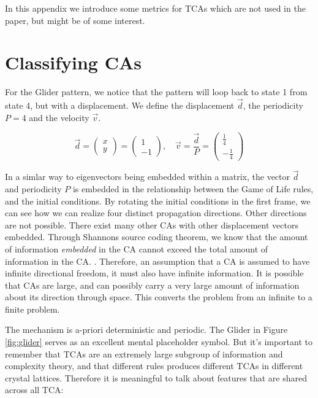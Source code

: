 \documentclass[notitlepage]{article}
\begin{document}
\begin{appendices}
In this appendix we introduce some metrics for TCAs which are not used in the paper, but might be of some interest. 
\section{Classifying CAs}


For the Glider pattern, we notice that the pattern will loop back to state 1 from state 4, but with a displacement. We define the displacement $\vec{d}$,  the periodicity $P =4$ and the velocity $\vec{v}$.

\begin{equation}
\vec{d} = \begin{pmatrix}
x \\ y 
\end{pmatrix} = 
\begin{pmatrix}
1 \\ -1 
\end{pmatrix}, \quad \vec{v}= \frac{ \vec{d}}{P}= \begin{pmatrix}
\frac{1}{4} \\ -\frac{1}{4} 
\end{pmatrix}
\end{equation}

In a simlar way to eigenvectors being embedded within a matrix, the vector $\vec{d}$ and periodicity $P$ is embedded in the relationship between the Game of Life rules, and the initial conditions. By rotating the initial conditions in the first frame, we can see how we can realize four distinct propagation directions. Other directions are not possible. There exist many other CAs with other displacement vectors embedded. Through Shannons source coding theorem, we know that the amount of information \textit{embedded} in the CA cannot exceed the total amount of information in the CA. \cite{shannon1}. Therefore, an assumption that a CA is assumed to have infinite directional freedom, it must also have infinite information. It is possible that CAs are large, and can possibly carry a very large amount of information about its direction through space. This converts the problem from an infinite to a finite problem.

The mechanism is a-priori deterministic and periodic. The Glider in Figure \ref{fig:glider} serves as an excellent mental placeholder symbol. But it's important to remember that TCAs are an extremely large subgroup of information and complexity theory, and that different rules produces different TCAs in different crystal lattices. Therefore it is meaningful to talk about features that are shared across all TCA:


\end{appendices}
\end{document}
